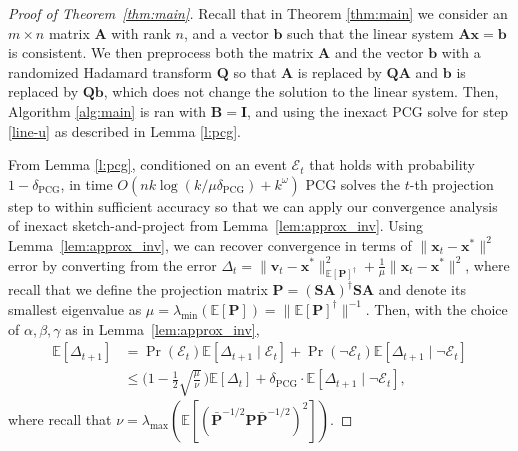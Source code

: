 \documentclass[11pt]{article}
\def\x{{\mathbf x}}
\def\v{{\mathbf v}}
\def\b{{\mathbf b}}
\def\A{{\mathbf A}}
\def\B{{\mathbf B}}
\def\I{{\mathbf I}}
\def\Q{{\mathbf Q}}
\def\S{{\mathbf S}}
\def\Ec{{\mathcal E}}
\def\P{{\mathbf P}}
\def\E{{\mathds E}}
\begin{document}
\begin{proof}[Proof of Theorem~\ref{thm:main}]
  Recall that in Theorem \ref{thm:main} we consider an $m\times n$ matrix $\A$ with rank $n$, and a vector $\b$ such that the linear system $\A\x=\b$ is consistent. We then preprocess both the matrix $\A$ and the vector $\b$ with a randomized Hadamard transform $\Q$ so that $\A$ is replaced by $\Q\A$ and $\b$ is replaced by $\Q\b$, which does not change the solution to the linear system. Then, Algorithm \ref{alg:main} is ran with $\B=\I$, and using the inexact PCG solve for step \ref{line-u} as described in Lemma \ref{l:pcg}.

  From Lemma \ref{l:pcg}, conditioned on an event $\Ec_t$ that holds with probability $1-\delta_{\mathrm{PCG}}$, in time $O(nk\log(k/\mu\delta_{\mathrm{PCG}})+k^\omega)$ PCG solves the $t$-th projection step to within sufficient accuracy so that we can apply our convergence analysis of inexact sketch-and-project from Lemma~\ref{lem:approx_inv}. 
  Using Lemma~\ref{lem:approx_inv}, we can recover convergence in terms of  $\|\x_t-\x^*\|^2$ error by converting from the error $\Delta_t=\|\v_t-\x^*\|_{\E[\P]^{\dagger}}^2+\frac1\mu\|\x_t-\x^*\|^2$, where recall that we define the projection matrix $\P=(\S\A)^{\dagger}\S\A$ and denote its smallest eigenvalue as $\mu = \lambda_{\min}(\E[\P]) = \|\E[\P]^\dagger\|^{-1}$. 
  Then, with the choice of $\alpha,\beta,\gamma$ as in Lemma~\ref{lem:approx_inv}, 
  \begin{align*}   
  \E[\Delta_{t+1}] &= \Pr(\Ec_t)\E[\Delta_{t+1}\mid \Ec_t] + \Pr(\neg\Ec_t)\E[\Delta_{t+1}\mid\neg\Ec_t]
      \\
    &\leq \bigg(1-\frac{1}{2}\sqrt{\frac{\mu}{\nu}}\,\bigg)\E[\Delta_t] + \delta_{\mathrm{PCG}}\cdot \E[\Delta_{t+1}\mid\neg\Ec_t],
  \end{align*}
  where recall that $\nu=\lambda_{\max}(\E[(\bar\P^{-1/2}\P\bar\P^{-1/2})^2])$.


\end{proof}
\end{document}
